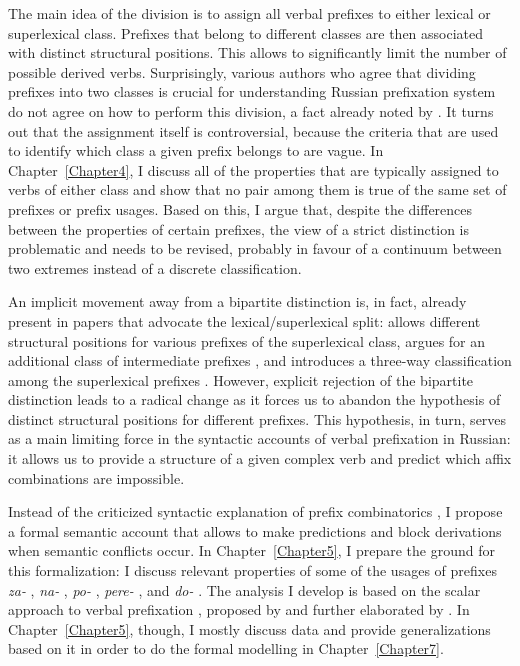 The main idea of the division is to assign all verbal prefixes to either lexical or superlexical class. Prefixes that belong to different classes are then associated with distinct structural positions. This allows to significantly limit the number of possible derived verbs. Surprisingly, various authors who agree that dividing prefixes into two classes is crucial for understanding Russian prefixation  system do not agree on how to perform this division, a fact already noted by \citet{Tatevosov:09}. It turns out that the assignment itself is controversial, because the criteria that are used to identify which class a given prefix belongs to are vague. In Chapter~\ref{Chapter4}, I discuss all of the properties that are typically assigned to verbs of either class and show that no pair among them is true of the same set of prefixes or prefix usages. Based on this, I argue that, despite the differences between the properties of certain prefixes, the view of a strict distinction is problematic and needs to be revised, probably in favour of a continuum between two extremes instead of a discrete classification. 

An implicit movement away from a bipartite distinction is, in fact, already present in papers that advocate the lexical/superlexical split: \citet{Svenonius:04b} allows different structural positions for various prefixes of the superlexical class, \citet{Tatevosov:07} argues for an additional class of intermediate prefixes , and \citet{Tatevosov:09} introduces a three-way classification  among the superlexical prefixes . However, explicit rejection of the bipartite distinction leads to a radical change as it forces us to abandon the hypothesis of distinct structural positions for different prefixes. This hypothesis, in turn, serves as a main limiting force in the syntactic accounts of  verbal prefixation  in Russian: it allows us to provide a structure of a given complex verb and predict which affix combinations are impossible.

Instead of the criticized syntactic explanation of prefix combinatorics , I propose a formal semantic account that allows to make predictions and block derivations when semantic conflicts occur. In Chapter~\ref{Chapter5}, I prepare the ground for this formalization: I discuss relevant properties of some of the usages of prefixes \textit{\mbox{za-}  }, \textit{na-}  , \textit{po-}  , \textit{pere-}  , and \textit{do-}  . The analysis I develop is based on the scalar approach to verbal prefixation , proposed by \citet{Filip:08} and further elaborated by \citet{Kagan:12, Kagan:book}. In Chapter~\ref{Chapter5}, though, I mostly discuss data and provide generalizations based on it in order to do the formal modelling in Chapter~\ref{Chapter7}.

